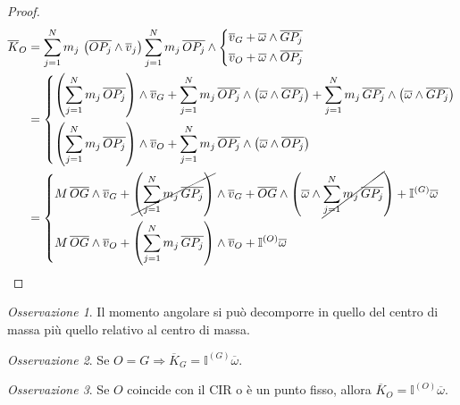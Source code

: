 \documentclass{book}
\theoremstyle{plain}
\theoremstyle{plain}
\theoremstyle{plain}
\theoremstyle{plain}
\theoremstyle{plain}
\theoremstyle{definition}
\theoremstyle{remark}
\newtheorem*{oss}{Osservazione}
\theoremstyle{definition}
\begin{document}
\begin{proof}
    \[
    \begin{split}
        \overline{K}_O&=\sum_{j=1}^Nm_j\,\left(\overline{OP_j}\wedge\overline{v}_j\right)\sum_{j=1}^Nm_j\,\overline{OP_j}\wedge\begin{dcases}
            \overline{v}_G+\overline{\omega}\wedge\overline{GP_j} \\
            \overline{v}_O+\overline{\omega}\wedge\overline{OP_j}
        \end{dcases} \\
        &=\begin{dcases}
            \left(\sum_{j=1}^Nm_j\,\overline{OP_j}\right)\wedge\overline{v}_G+\sum_{j=1}^Nm_j\,\overline{OP_j}\wedge\left(\overline{\omega}\wedge\overline{GP_j}\right)+\sum_{j=1}^Nm_j\,\overline{GP_j}\wedge\left(\overline{\omega}\wedge\overline{GP_j}\right) \\
            \left(\sum_{j=1}^Nm_j\,\overline{OP_j}\right)\wedge\overline{v}_O+\sum_{j=1}^Nm_j\,\overline{OP_j}\wedge\left(\overline{\omega}\wedge\overline{OP_j}\right)
        \end{dcases} \\
        &=\begin{dcases}
            M\,\overline{OG}\wedge\overline{v}_G+\cancel{\left(\sum_{j=1}^Nm_j\,\overline{GP_j}\right)}\wedge\overline{v}_G+\overline{OG}\wedge\left(\overline{\omega}\wedge\cancel{\sum_{j=1}^Nm_j\,\overline{GP_j}}\right)+\mathbb{I}^{(G)}\overline{\omega} \\
            M\,\overline{OG}\wedge\overline{v}_O+\left(\sum_{j=1}^Nm_j\,\overline{GP_j}\right)\wedge\overline{v}_O+\mathbb{I}^{(O)}\overline{\omega}
        \end{dcases}
    \end{split}
    \]
\end{proof}

\begin{oss}
     Il momento angolare si può decomporre in quello del centro di massa più quello relativo al centro di massa.
\end{oss}

\begin{oss}
    Se $O=G \Longrightarrow \overline{K}_G=\mathbb{I}^{(G)}\overline{\omega}$.
\end{oss}

\begin{oss}
    Se $O$ coincide con il CIR o è un punto fisso, allora $\overline{K}_O=\mathbb{I}^{(O)}\overline{\omega}$.
\end{oss}
\end{document}
